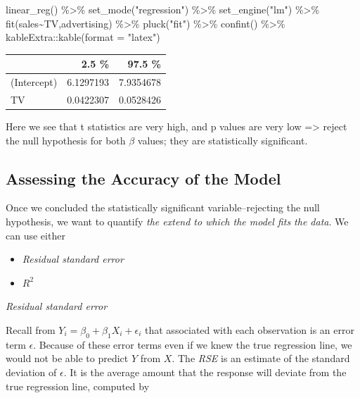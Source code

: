 \documentclass[
  letterpaper,
  DIV=11,
  numbers=noendperiod]{scrreprt}
\newenvironment{Shaded}{\begin{snugshade}}{\end{snugshade}}
\newcommand{\AttributeTok}[1]{\textcolor[rgb]{0.65,0.35,0.00}{#1}}
\newcommand{\FunctionTok}[1]{\textcolor[rgb]{0.02,0.16,0.49}{#1}}
\newcommand{\NormalTok}[1]{\textcolor[rgb]{0.33,0.33,0.33}{#1}}
\newcommand{\SpecialCharTok}[1]{\textcolor[rgb]{0.00,0.46,0.62}{#1}}
\newcommand{\StringTok}[1]{\textcolor[rgb]{0.00,0.50,0.00}{#1}}
\providecommand{\tightlist}{%
  \setlength{\itemsep}{0pt}\setlength{\parskip}{0pt}}\usepackage{longtable,booktabs,array}
\begin{document}
\begin{Shaded}
\begin{Highlighting}[]
\FunctionTok{linear\_reg}\NormalTok{() }\SpecialCharTok{\%\textgreater{}\%} 
  \FunctionTok{set\_mode}\NormalTok{(}\StringTok{"regression"}\NormalTok{) }\SpecialCharTok{\%\textgreater{}\%} 
  \FunctionTok{set\_engine}\NormalTok{(}\StringTok{"lm"}\NormalTok{) }\SpecialCharTok{\%\textgreater{}\%} 
  \FunctionTok{fit}\NormalTok{(sales}\SpecialCharTok{\textasciitilde{}}\NormalTok{TV,advertising) }\SpecialCharTok{\%\textgreater{}\%} 
  \FunctionTok{pluck}\NormalTok{(}\StringTok{"fit"}\NormalTok{) }\SpecialCharTok{\%\textgreater{}\%} 
  \FunctionTok{confint}\NormalTok{() }\SpecialCharTok{\%\textgreater{}\%} 
\NormalTok{  kableExtra}\SpecialCharTok{::}\FunctionTok{kable}\NormalTok{(}\AttributeTok{format =} \StringTok{"latex"}\NormalTok{)}
\end{Highlighting}
\end{Shaded}

\begin{tabular}{l|r|r}
\hline
  & 2.5 \% & 97.5 \%\\
\hline
(Intercept) & 6.1297193 & 7.9354678\\
\hline
TV & 0.0422307 & 0.0528426\\
\hline
\end{tabular}

Here we see that t statistics are very high, and p values are very low
=\textgreater{} reject the null hypothesis for both \(\beta\) values;
they are statistically significant.

\hypertarget{assessing-the-accuracy-of-the-model}{%
\subsection{Assessing the Accuracy of the
Model}\label{assessing-the-accuracy-of-the-model}}

Once we concluded the statistically significant variable--rejecting the
null hypothesis, we want to quantify \emph{the extend to which the model
fits the data}. We can use either

\begin{itemize}
\tightlist
\item
  \emph{Residual standard error}
\item
  \(R^2\)
\end{itemize}

\emph{Residual standard error}

Recall from \(Y_i = \beta_0 + \beta_1 X_i + \epsilon_i\) that associated
with each observation is an error term \(\epsilon\). Because of these
error terms even if we knew the true regression line, we would not be
able to predict \(Y\) from \(X\). The \emph{RSE} is an estimate of the
standard deviation of \(\epsilon\). It is the average amount that the
response will deviate from the true regression line, computed by
\end{document}
